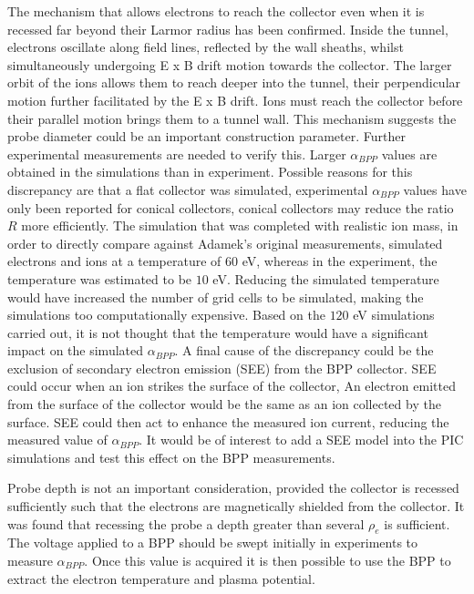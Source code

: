 The mechanism that allows electrons to reach the collector even when it is recessed far beyond their Larmor radius has been confirmed. Inside the tunnel, electrons oscillate along field lines, reflected by the wall sheaths, whilst simultaneously undergoing E x B drift motion towards the collector. The larger orbit of the ions allows them to reach deeper into the tunnel, their perpendicular motion further facilitated by the E x B drift. Ions must reach the collector before their parallel motion brings them to a tunnel wall. This mechanism suggests the probe diameter could be an important construction parameter. Further experimental measurements are needed to verify this. Larger $\alpha_{BPP}$ values are obtained in the simulations than in experiment. Possible reasons for this discrepancy are that a flat collector was simulated, experimental $\alpha_{BPP}$ values have only been reported for conical collectors, conical collectors may reduce the ratio $R$ more efficiently. The simulation that was completed with realistic ion mass, in order to directly compare against Adamek's original measurements, simulated electrons and ions at a temperature of $60$ eV, whereas in the experiment, the temperature was estimated to be $10$ eV. Reducing the simulated temperature would have increased the number of grid cells to be simulated, making the simulations too computationally expensive. Based on the $120$ eV simulations carried out, it is not thought that the temperature would have a significant impact on the simulated $\alpha_{BPP}$. A final cause of the discrepancy could be the exclusion of secondary electron emission (SEE) from the BPP collector. SEE could occur when an ion strikes the surface of the collector, An electron emitted from the surface of the collector would be the same as an ion collected by the surface. SEE could then act to enhance the measured ion current, reducing the measured value of $\alpha_{BPP}$. It would be of interest to add a SEE model into the PIC simulations and test this effect on the BPP measurements.  




 Probe depth is not an important consideration, provided the collector is recessed sufficiently such that the electrons are magnetically shielded from the collector. It was found that recessing the probe a depth greater than several $\rho_e$ is sufficient. The voltage applied to a BPP should be swept initially in experiments to measure $\alpha_{BPP}$. Once this value is acquired it is then possible to use the BPP to extract the electron temperature and plasma potential.

